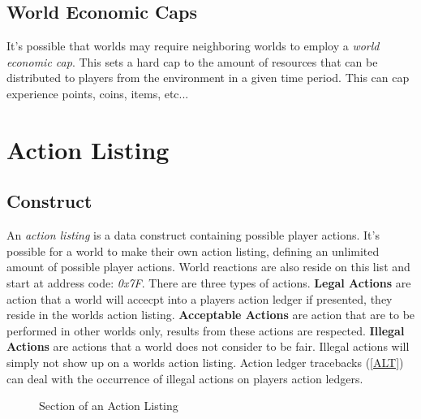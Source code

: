 \documentclass[runningheads,a4paper]{llncs}
\begin{document}
\subsection{World Economic Caps}
It's possible that worlds may require neighboring worlds to employ a \textit{world economic cap}. This sets a hard cap to the amount of resources that can be distributed to players from the environment in a given time period. This can cap experience points, coins, items, etc...



\section{Action Listing} %
\subsection{Construct}
An \textit{action listing} is a data construct containing possible player actions. It's possible for a world to make their own action listing, defining an unlimited amount of possible player actions. World reactions are also reside on this list and start at address code: \textit{0x7F}. There are three types of actions. \textbf{Legal Actions} are action that a world will accecpt into a players action ledger if presented, they reside in the worlds action listing. \textbf{Acceptable Actions} are action that are to be performed in other worlds only, results from these actions are respected. \textbf{Illegal Actions} are actions that a world does not consider to be fair. Illegal actions will simply not show up on a worlds action listing. Action ledger tracebacks (\ref{ALT}) can deal with the occurrence of illegal actions on players action ledgers. 

\begin{figure}
\caption{Section of an Action Listing}
\label{CodeAL}

\end{figure}
\end{document}

